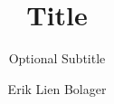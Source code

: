 \documentclass[a4paper, oneside, openany, british]{memoir}
\title{Title}
\subtitle{Optional Subtitle}
\author{Erik Lien Bolager}
\begin{document}
    \frontmatter        %

    \masterfrontpage


    \mainmatter         %
    
    


    \backmatter         %

    \printbibliography
\end{document}
